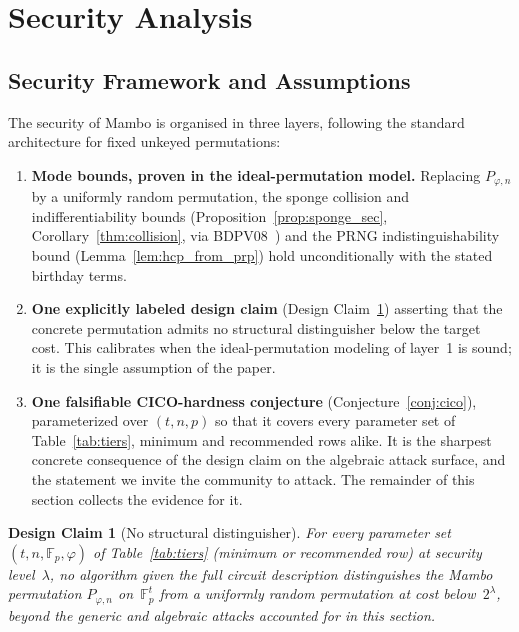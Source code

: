 \documentclass[11pt,a4paper]{article}
\newtheorem{designclaim}[theorem]{Design Claim}
\theoremstyle{definition}
\newcommand{\Fp}{\mathbb{F}_p}
\begin{document}
\section{Security Analysis}\label{sec:security}

\subsection{Security Framework and Assumptions}\label{sec:security:framework}

The security of Mambo is organised in three layers, following the
standard architecture for fixed unkeyed permutations:
\begin{enumerate}[nosep]
  \item \textbf{Mode bounds, proven in the ideal-permutation model.}
        Replacing $P_{\varphi,n}$ by a uniformly random permutation,
        the sponge collision and indifferentiability bounds
        (Proposition~\ref{prop:sponge_sec},
        Corollary~\ref{thm:collision}, via BDPV08~\cite{BDPV08}) and
        the PRNG indistinguishability bound
        (Lemma~\ref{lem:hcp_from_prp}) hold unconditionally with the
        stated birthday terms.
  \item \textbf{One explicitly labeled design claim}
        (Design Claim~\ref{claim:structural}) asserting that the
        concrete permutation admits no structural distinguisher below
        the target cost. This calibrates when the ideal-permutation
        modeling of layer~1 is sound; it is the single assumption of
        the paper.
  \item \textbf{One falsifiable CICO-hardness conjecture}
        (Conjecture~\ref{conj:cico}), parameterized over $(t, n, p)$
        so that it covers every parameter set of
        Table~\ref{tab:tiers}, minimum and recommended rows alike. It is the
        sharpest concrete consequence of the design claim on the
        algebraic attack surface, and the statement we invite the
        community to attack. The remainder of this section collects
        the evidence for it.
\end{enumerate}

\begin{designclaim}[No structural distinguisher]\label{claim:structural}
For every parameter set $(t, n, \Fp, \varphi)$ of
Table~\ref{tab:tiers} (minimum or recommended row) at security
level~$\lambda$, no algorithm given
the full circuit description distinguishes the Mambo permutation
$P_{\varphi,n}$ on~$\Fp^t$ from a uniformly random permutation at cost
below~$2^{\lambda}$, beyond the generic and algebraic attacks
accounted for in this section.
\end{designclaim}
\end{document}
